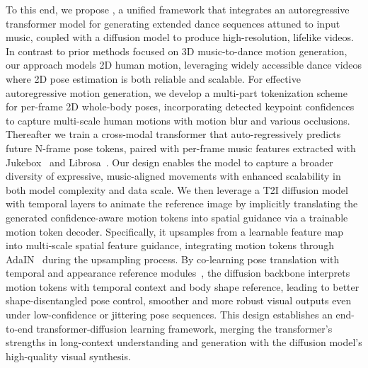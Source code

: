 To this end, we propose \papername, a unified framework that integrates an autoregressive transformer model for generating extended dance sequences attuned to input music, coupled with a diffusion model to produce high-resolution, lifelike videos. In contrast to prior methods focused on 3D music-to-dance motion generation, our approach models 2D human motion, leveraging widely accessible dance videos where 2D pose estimation is both reliable and scalable. For effective autoregressive motion generation, we develop a multi-part tokenization scheme for per-frame 2D whole-body poses, incorporating detected keypoint confidences to capture multi-scale human motions with motion blur and various occlusions. Thereafter we train a cross-modal transformer that auto-regressively predicts future N-frame pose tokens, paired with per-frame music features extracted with Jukebox~\cite{dhariwal2020jukebox} and Librosa~\cite{jin2017towards}. Our design enables the model to capture a broader diversity of expressive, music-aligned movements with enhanced scalability in both model complexity and data scale. We then leverage a T2I diffusion model with temporal layers to animate the reference image by implicitly translating the generated confidence-aware motion tokens into spatial guidance via a trainable motion token decoder. Specifically, it upsamples from a learnable feature map into multi-scale spatial feature guidance, integrating motion tokens through AdaIN~\cite{huang2017arbitrary} during the upsampling process.
By co-learning pose translation with temporal and appearance reference modules~\cite{guo2023animatediff,cao2023masactrl}, the diffusion backbone interprets motion tokens with temporal context and body shape reference,  leading to better shape-disentangled pose control,  smoother and more robust visual outputs even under low-confidence or jittering pose sequences.  
This design establishes an end-to-end transformer-diffusion learning framework, merging the transformer’s strengths in long-context understanding and generation with the diffusion model’s high-quality visual synthesis.

